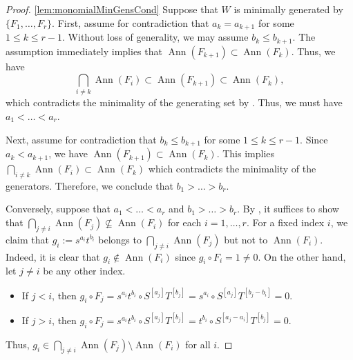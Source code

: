 \documentclass[a4paper, 11pt]{amsart}
\numberwithin{theorem}{section}
\theoremstyle{definition}
\numberwithin{equation}{section}
\DeclareMathOperator{\Ann}{\operatorname{Ann}}
\begin{document}
\begin{proof} 
\eqref{lem:monomialMinGensCond} Suppose that $W$ is minimally generated by $\{F_1, \dots, F_r\}$. 
First, assume for contradiction that $a_k = a_{k+1}$ for some $1 \leq k \leq r-1$. 
Without loss of generality, we may assume $b_k \leq b_{k+1}$. 
The assumption immediately implies that $\Ann(F_{k+1}) \subset \Ann(F_k)$. 
Thus, we have
\[
\bigcap_{i \neq k} \Ann(F_i) \subset \Ann(F_{k+1}) \subset \Ann(F_k),
\]
which contradicts the minimality of the generating set by . 
Thus, we must have $a_1 < \dots < a_r$.

Next, assume for contradiction that $b_k \leq b_{k+1}$ for some $1 \leq k \leq r-1$. 
Since $a_k < a_{k+1}$, we have $\Ann(F_{k+1}) \subset \Ann(F_k)$.
This implies $\bigcap_{i \neq k} \Ann(F_i) \subset \Ann(F_k)$ which contradicts the minimality of the generators. 
Therefore, we conclude that $b_1 > \dots > b_r$.

Conversely, suppose that $a_1 < \dots < a_r$ and $b_1 > \dots > b_r$. 
By , it suffices to show that $\bigcap_{j \neq i} \Ann(F_j) \not\subseteq \Ann(F_i)$ for each $i = 1, \dots, r$. 
For a fixed index $i$, we claim that $g_i := s^{a_i}t^{b_i}$ belongs to $\bigcap_{j \neq i} \Ann(F_j)$ but not to $\Ann(F_i)$. 
Indeed, it is clear that $g_i \notin \Ann(F_i)$ since $g_i \circ F_i = 1 \neq 0$. 
On the other hand, let $j \neq i$ be any other index.
\begin{itemize}
    \item If $j < i$, then $g_i \circ F_j = s^{a_i}t^{b_i} \circ S^{[a_j]}T^{[b_j]} = s^{a_i} \circ S^{[a_j]}T^{[b_j-b_i]} = 0$.
    \item If $j > i$, then $g_i \circ F_j = s^{a_i}t^{b_i} \circ S^{[a_j]}T^{[b_j]} = t^{b_i} \circ S^{[a_j-a_i]}T^{[b_j]} = 0$.
\end{itemize}
Thus, $g_i \in \bigcap_{j \neq i} \Ann(F_j) \setminus \Ann(F_i)$ for all $i$.


\end{proof}
\end{document}
